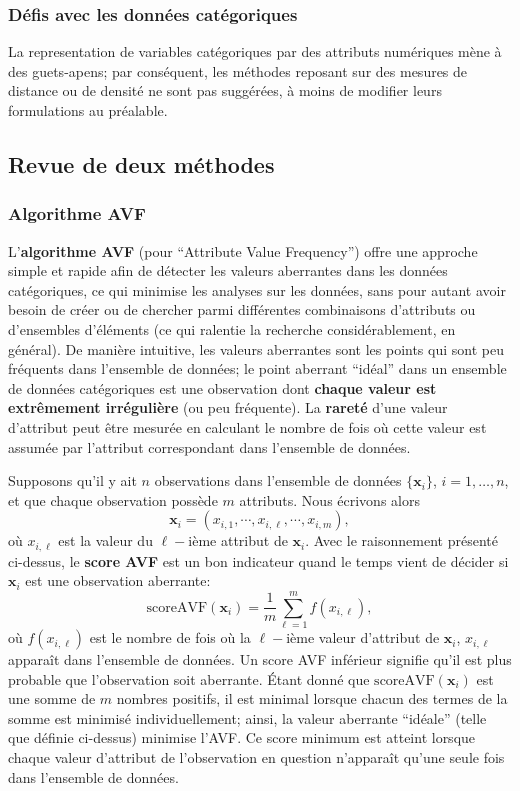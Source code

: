 \subsubsection*{Défis avec les données catégoriques}
La representation de variables cat\'egoriques par des attributs numériques m\`ene \`a des guets-apens; par conséquent, les méthodes reposant sur des mesures de distance ou de densité ne sont pas sugg\'er\'ees, \`a moins de modifier  leurs formulations au pr\'ealable.

\subsection{Revue de deux méthodes}
\subsubsection*{Algorithme AVF}
L'\textbf{algorithme AVF} (pour ``Attribute Value Frequency'') offre une approche simple et rapide afin de détecter les valeurs aberrantes dans les données catégoriques, ce qui minimise les analyses sur les données, sans pour autant avoir besoin de créer ou de chercher parmi différentes combinaisons d’attributs ou d'ensembles d'éléments (ce qui ralentie la recherche consid\'erablement, en g\'en\'eral).  \newline\newline De mani\`ere intuitive,  les valeurs aberrantes sont les points qui sont peu fréquents dans l'ensemble de données;  le point aberrant ``idéal'' dans un ensemble de données catégoriques est une observation  dont \textbf{chaque valeur est extrêmement irrégulière} (ou peu fréquente). 
\newline\newline La \textbf{rareté} d'une valeur d'attribut peut être mesurée en calculant le nombre de fois où cette valeur est assumée par l'attribut correspondant dans l'ensemble de données. 

Supposons qu'il y ait $n$ observations dans l'ensemble de données $\{\mathbf{x}_i\}$, $i = 1, \ldots, n$, et que chaque observation poss\`ede $m$ attributs. Nous écrivons alors $$\mathbf{x}_{i} = (x_{i,1}, \cdots , x_{i,\ell}, \cdots, x_{i,m}),$$ o\`u $x_{i,\ell}$ est la valeur du $\ell-$ième attribut de $\mathbf{x}_i$. Avec le  raisonnement pr\'esent\'e ci-dessus, le \textbf{score AVF} est un bon indicateur quand le temps vient de décider si $\textbf{x}_i$ est une observation aberrante:
$$\text{scoreAVF}(\mathbf{x}_i) = \frac{1}{m} \sum_{\ell=1}^{m}f(x_{i,\ell}),$$
où $f(x_{i,\ell})$ est le nombre de fois où la $\ell-$ième valeur d'attribut de $\mathbf{x}_i$, $x_{i,\ell}$ apparaît dans l'ensemble de données. Un score AVF inférieur signifie qu'il est plus probable que l'observation soit aberrante. 
\newline\newline Étant donné que $\text{scoreAVF}(\mathbf{x}_i) $ est une somme de $m$ nombres positifs, il est minimal lorsque chacun des termes de la somme est minimisé individuellement; ainsi, la valeur aberrante ``idéale'' (telle que définie ci-dessus) minimise l'AVF. Ce score minimum est atteint lorsque chaque valeur d'attribut de l'observation en question n'apparaît qu'une seule fois dans l'ensemble de donn\'ees.


